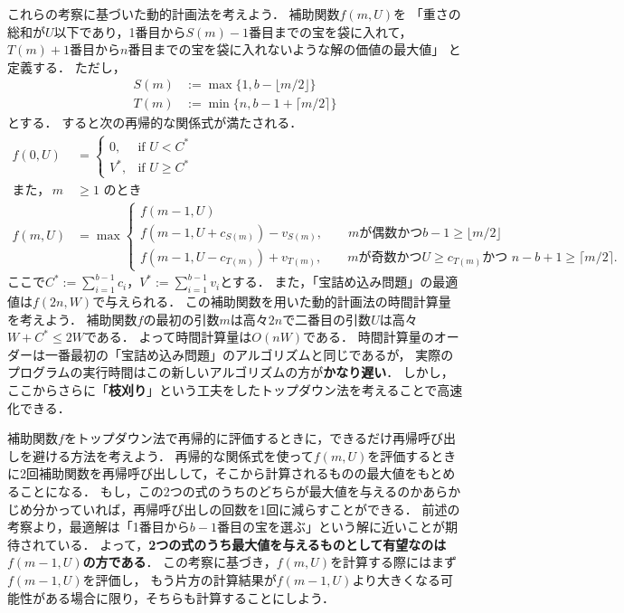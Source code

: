 \documentclass[a4paper,twoside,onecolumn,openany,article]{memoir}
\theoremstyle{remark}
\begin{document}
これらの考察に基づいた動的計画法を考えよう．
補助関数$f(m, U)$を
「重さの総和が$U$以下であり，1番目から$S(m)-1$番目までの宝を袋に入れて，$T(m)+1$番目から$n$番目までの宝を袋に入れないような解の価値の最大値」
と定義する．
ただし，
\begin{align*}
S(m)&:=\max\{1, b-\lfloor m/2\rfloor\}\\
T(m)&:=\min\{n, b-1+\lceil m/2\rceil\}
\end{align*}
とする．
すると次の再帰的な関係式が満たされる．
\begin{align*}
f(0,U)&=
\begin{cases}
0,& \text{if } U < C^*\\
V^*,& \text{if } U \ge C^*
\end{cases}\\
\text{また，}\, m&\ge 1\text{ のとき}\\
f(m,U)&= \max
\begin{cases}
f(m-1,U)\\
f(m-1,U+c_{S(m)})-v_{S(m)},\qquad\text{$m$が偶数かつ$b-1\ge \lfloor m/2\rfloor$}\\
f(m-1,U-c_{T(m)})+v_{T(m)},\qquad\text{$m$が奇数かつ$U\ge c_{T(m)}$かつ $n-b+1\ge \lceil m/2\rceil$.}
\end{cases}
\end{align*}
ここで$C^*:=\sum_{i=1}^{b-1} c_i$，$V^*:=\sum_{i=1}^{b-1} v_i$とする．
また，「宝詰め込み問題」の最適値は$f(2n,W)$で与えられる．
この補助関数を用いた動的計画法の時間計算量を考えよう．
補助関数$f$の最初の引数$m$は高々$2n$で二番目の引数$U$は高々$W+C^*\le 2W$である．
よって時間計算量は$O(nW)$である．
時間計算量のオーダーは一番最初の「宝詰め込み問題」のアルゴリズムと同じであるが，
実際のプログラムの実行時間はこの新しいアルゴリズムの方が\textbf{かなり遅い}．
しかし，ここからさらに「\textbf{枝刈り}」という工夫をしたトップダウン法を考えることで高速化できる．

補助関数$f$をトップダウン法で再帰的に評価するときに，できるだけ再帰呼び出しを避ける方法を考えよう．
再帰的な関係式を使って$f(m,U)$を評価するときに2回補助関数を再帰呼び出しして，そこから計算されるものの最大値をもとめることになる．
もし，この2つの式のうちのどちらが最大値を与えるのかあらかじめ分かっていれば，再帰呼び出しの回数を1回に減らすことができる．
前述の考察より，最適解は「1番目から$b-1$番目の宝を選ぶ」という解に近いことが期待されている．
よって，\textbf{2つの式のうち最大値を与えるものとして有望なのは$f(m-1,U)$の方である}．
この考察に基づき，$f(m,U)$を計算する際にはまず$f(m-1,U)$を評価し，
もう片方の計算結果が$f(m-1,U)$より大きくなる可能性がある場合に限り，そちらも計算することにしよう．
\end{document}
